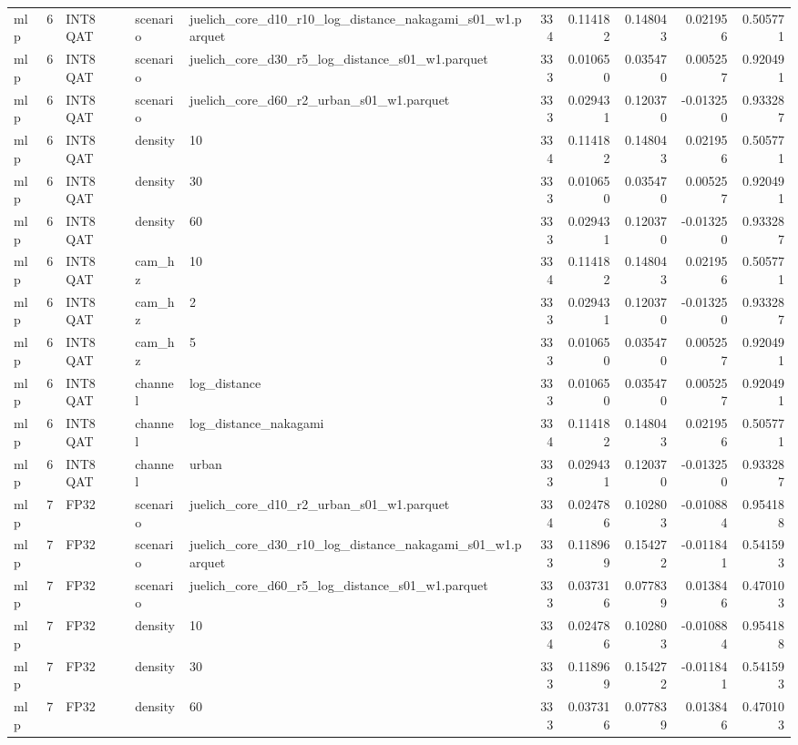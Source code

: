 \begin{tabular}{lrlllrrrrr}
mlp & 6 & INT8 QAT & scenario & juelich\_core\_d10\_r10\_log\_distance\_nakagami\_s01\_w1.parquet & 334 & 0.114182 & 0.148043 & 0.021956 & 0.505771 \\
mlp & 6 & INT8 QAT & scenario & juelich\_core\_d30\_r5\_log\_distance\_s01\_w1.parquet & 333 & 0.010650 & 0.035470 & 0.005257 & 0.920491 \\
mlp & 6 & INT8 QAT & scenario & juelich\_core\_d60\_r2\_urban\_s01\_w1.parquet & 333 & 0.029431 & 0.120370 & -0.013250 & 0.933287 \\
mlp & 6 & INT8 QAT & density & 10 & 334 & 0.114182 & 0.148043 & 0.021956 & 0.505771 \\
mlp & 6 & INT8 QAT & density & 30 & 333 & 0.010650 & 0.035470 & 0.005257 & 0.920491 \\
mlp & 6 & INT8 QAT & density & 60 & 333 & 0.029431 & 0.120370 & -0.013250 & 0.933287 \\
mlp & 6 & INT8 QAT & cam\_hz & 10 & 334 & 0.114182 & 0.148043 & 0.021956 & 0.505771 \\
mlp & 6 & INT8 QAT & cam\_hz & 2 & 333 & 0.029431 & 0.120370 & -0.013250 & 0.933287 \\
mlp & 6 & INT8 QAT & cam\_hz & 5 & 333 & 0.010650 & 0.035470 & 0.005257 & 0.920491 \\
mlp & 6 & INT8 QAT & channel & log\_distance & 333 & 0.010650 & 0.035470 & 0.005257 & 0.920491 \\
mlp & 6 & INT8 QAT & channel & log\_distance\_nakagami & 334 & 0.114182 & 0.148043 & 0.021956 & 0.505771 \\
mlp & 6 & INT8 QAT & channel & urban & 333 & 0.029431 & 0.120370 & -0.013250 & 0.933287 \\
mlp & 7 & FP32 & scenario & juelich\_core\_d10\_r2\_urban\_s01\_w1.parquet & 334 & 0.024786 & 0.102803 & -0.010884 & 0.954188 \\
mlp & 7 & FP32 & scenario & juelich\_core\_d30\_r10\_log\_distance\_nakagami\_s01\_w1.parquet & 333 & 0.118969 & 0.154272 & -0.011841 & 0.541593 \\
mlp & 7 & FP32 & scenario & juelich\_core\_d60\_r5\_log\_distance\_s01\_w1.parquet & 333 & 0.037316 & 0.077839 & 0.013846 & 0.470103 \\
mlp & 7 & FP32 & density & 10 & 334 & 0.024786 & 0.102803 & -0.010884 & 0.954188 \\
mlp & 7 & FP32 & density & 30 & 333 & 0.118969 & 0.154272 & -0.011841 & 0.541593 \\
mlp & 7 & FP32 & density & 60 & 333 & 0.037316 & 0.077839 & 0.013846 & 0.470103 \\

\end{tabular}
